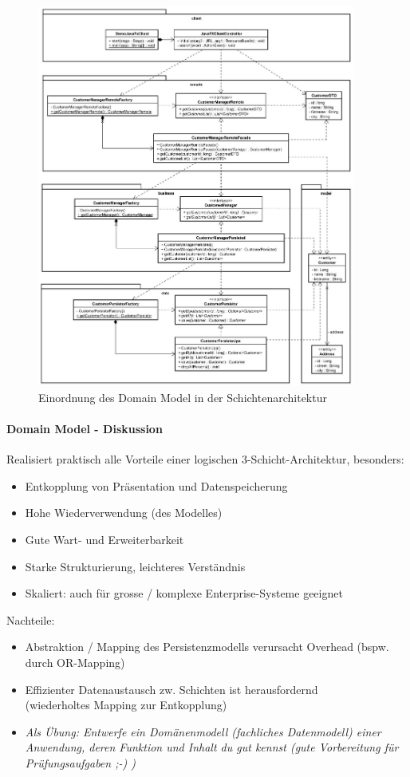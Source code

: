 \documentclass[a4paper]{article}
\begin{document}
			\begin{figure}[!htb]
				\centering
				\includegraphics[keepaspectratio, height=12.6cm, angle=270, origin=c]{img/architecture/domainmodel.jpg}
				\caption{Einordnung des Domain Model in der Schichtenarchitektur}
			\end{figure}
		
			\newpage
			
			\paragraph{Domain Model - Diskussion}
			Realisiert praktisch alle Vorteile einer logischen 3-Schicht-Architektur, besonders:
			\begin{itemize}
				\item Entkopplung von Präsentation und Datenspeicherung
				\item Hohe Wiederverwendung (des Modelles)
				\item Gute Wart- und Erweiterbarkeit
				\item Starke Strukturierung, leichteres Verständnis
				\item Skaliert: auch für grosse / komplexe Enterprise-Systeme geeignet
			\end{itemize}
			Nachteile:
			\begin{itemize}
				\item Abstraktion / Mapping des Persistenzmodells verursacht Overhead (bspw. durch OR-Mapping)
				\item Effizienter Datenaustausch zw. Schichten ist herausfordernd \\
				(wiederholtes Mapping zur Entkopplung)
				\item \textit{Als Übung: Entwerfe ein Domänenmodell (fachliches Datenmodell) einer Anwendung, deren Funktion und Inhalt du gut kennst (gute Vorbereitung für Prüfungsaufgaben ;-) )} 
			\end{itemize}
		
\end{document}
